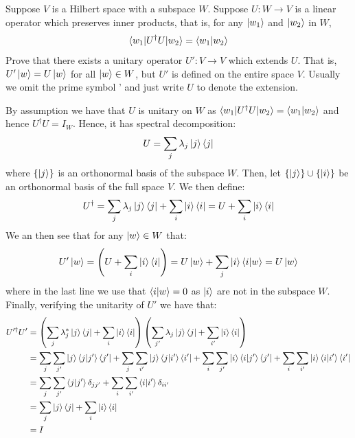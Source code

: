 \begin{example}
    Suppose $V$ is a Hilbert space with a subspace $W$. Suppose $U:W\rightarrow V$ is a linear operator which preserves inner products, that is, for any $\ket{w_1}$ and $\ket{w_2}$ in $W$,
    \[
    \braket{w_1|U^{\dagger}U|w_2}=\braket{w_1|w_2}
    \]
    Prove that there exists a unitary operator $U':V\rightarrow V$ which extends $U$. That is, $U'\ket{w}=U\ket{w}$ for all $\ket{w} \in W$, but $U'$ is defined on the entire space $V$. Usually we omit the prime symbol ' and just write $U$ to denote the extension.

    By assumption we have that $U$ is unitary on $W$ as $\braket{w_1|U^{\dagger}U|w_2}=\braket{w_1|w_2}$ and hence $U^{\dagger}U=I_W$. Hence, it has spectral decomposition:
    \[
    U=\sum_j \lambda_j \ket{j}\bra{j}
    \]
    where $\{\ket{j}\}$ is an orthonormal basis of the subspace $W$. Then, let $\{\ket{j}\} \cup \{\ket{i}\}$ be an orthonormal basis of the full space $V$. We then define:
    \[
    U^{\dagger}=\sum_j\lambda_j\ket{j}\bra{j}+\sum_i\ket{i}\bra{i}=U+\sum_i\ket{i}\bra{i}
    \]
    We an then see that for any $\ket{w}\in W$ that:
    \[
    U'\ket{w}=\left(U + \sum_i\ket{i}\bra{i}\right)=U\ket{w}+\sum_j\ket{i}\braket{i|w}=U\ket{w}
    \]
    where in the last line we use that $\braket{i|w}=0$ as $\ket{i}$ are not in the subspace $W$. Finally, verifying the unitarity of $U'$ we have that:
    \begin{align*}
        U'^{\dagger}U'&=\left(\sum_j \lambda_j^* \ket{j}\bra{j}+\sum_i\ket{i}\bra{i}\right)\left(\sum_{j'}\lambda_j \ket{j}\bra{j} + \sum_{i'} \ket{i}\bra{i}\right)\\
        &=\sum_j\sum_{j'} \ket{j}\braket{j|j'}\bra{j'}+\sum_j\sum_{i'}\ket{j}\braket{j|i'}\bra{i'} + \sum_i\sum_{j'}\ket{i}\braket{i|j'}\bra{j'}+\sum_i\sum_{i'} \ket{i}\braket{i|i'}\bra{i'}\\
        &=\sum_j\sum_{j'}\braket{j|j'}\delta_{jj'} + \sum_i\sum_{i'} \braket{i|i'}\delta_{ii'}\\
        &=\sum_j \ket{j}\bra{j} + \sum_i \ket{i}\bra{i}\\
        &=I
    \end{align*}
\end{example}



\chapterreferences
